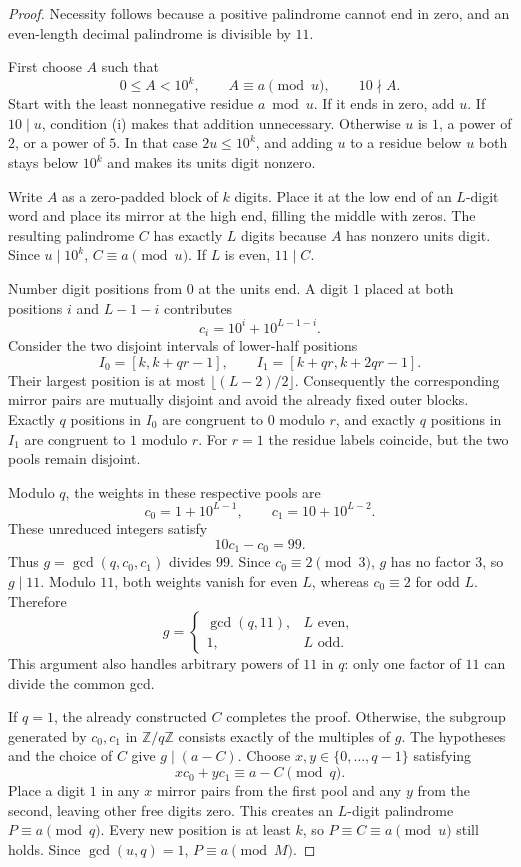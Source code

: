 \documentclass[11pt]{article}
\begin{document}
\begin{proof}
Necessity follows because a positive palindrome cannot end in zero, and
an even-length decimal palindrome is divisible by $11$.

First choose $A$ such that
\[
 0\leq A<10^k,\qquad A\equiv a\pmod u,\qquad 10\nmid A.
\]
Start with the least nonnegative residue $a\bmod u$. If it ends in zero,
add $u$. If $10\mid u$, condition (i) makes that addition unnecessary.
Otherwise $u$ is $1$, a power of $2$, or a power of $5$. In that case
$2u\leq10^k$, and adding $u$ to a residue below $u$ both stays below
$10^k$ and makes its units digit nonzero.

Write $A$ as a zero-padded block of $k$ digits. Place it at the low end of
an $L$-digit word and place its mirror at the high end, filling the middle
with zeros. The resulting palindrome $C$ has exactly $L$ digits because
$A$ has nonzero units digit. Since $u\mid10^k$,
$C\equiv a\pmod u$. If $L$ is even, $11\mid C$.

Number digit positions from $0$ at the units end. A digit $1$ placed at
both positions $i$ and $L-1-i$ contributes
\[
 c_i=10^i+10^{L-1-i}.
\]
Consider the two disjoint intervals of lower-half positions
\[
 I_0=[k,k+qr-1],\qquad I_1=[k+qr,k+2qr-1].
\]
Their largest position is at most $\lfloor(L-2)/2\rfloor$. Consequently
the corresponding mirror pairs are mutually disjoint and avoid the
already fixed outer blocks. Exactly $q$ positions in $I_0$ are congruent
to $0$ modulo $r$, and exactly $q$ positions in $I_1$ are congruent to $1$
modulo $r$. For $r=1$ the residue labels coincide, but the two pools remain
disjoint.

Modulo $q$, the weights in these respective pools are
\[
 c_0=1+10^{L-1},\qquad c_1=10+10^{L-2}.
\]
These unreduced integers satisfy
\[
 10c_1-c_0=99.
\]
Thus $g=\gcd(q,c_0,c_1)$ divides $99$. Since $c_0\equiv2\pmod3$,
$g$ has no factor $3$, so $g\mid11$. Modulo $11$, both weights vanish
for even $L$, whereas $c_0\equiv2$ for odd $L$. Therefore
\[
 g=\begin{cases}\gcd(q,11),&L\text{ even},\\1,&L\text{ odd}.\end{cases}
\]
This argument also handles arbitrary powers of $11$ in $q$: only one
factor of $11$ can divide the common gcd.

If $q=1$, the already constructed $C$ completes the proof. Otherwise,
the subgroup generated by $c_0,c_1$ in $\mathbb Z/q\mathbb Z$ consists
exactly of the multiples of $g$. The hypotheses and the choice of $C$
give $g\mid(a-C)$. Choose $x,y\in\{0,\ldots,q-1\}$ satisfying
\[
 xc_0+yc_1\equiv a-C\pmod q.
\]
Place a digit $1$ in any $x$ mirror pairs from the first pool and any $y$
from the second, leaving other free digits zero. This creates an $L$-digit
palindrome $P\equiv a\pmod q$. Every new position is at least $k$,
so $P\equiv C\equiv a\pmod u$ still holds. Since $\gcd(u,q)=1$,
$P\equiv a\pmod M$.
\end{proof}
\end{document}
